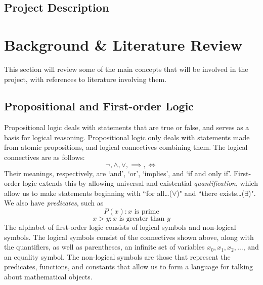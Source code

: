 \documentclass[12pt]{article}
\theoremstyle{definition}
\begin{document}
\subsection{Project Description}


\section{Background \& Literature Review}
This section will review some of the main concepts that will be involved in the project, with references to literature involving them.

\subsection{Propositional and First-order Logic}
Propositional logic deals with statements that are true or false, and serves as a basis for logical reasoning. Propositional logic only deals with statements made from atomic propositions, and logical connectives combining them. The logical connectives are as follows:
$$\neg, \wedge, \vee,\implies,\iff$$
Their meanings, respectively, are `and', `or', `implies', and `if and only if'.
\noindent
First-order logic extends this by allowing universal and existential \emph{quantification}, which allow us to make statements beginning with ``for all\ldots ($\forall$)" and ``there exists\ldots ($\exists$)". We also have \emph{predicates}, such as
$$P(x) : x \text{ is prime}$$
$$ x > y : x \text{ is greater than } y$$
\noindent
The alphabet of first-order logic consists of logical symbols and non-logical symbols.
The logical symbols consist of the connectives shown above, along with the quantifiers, as well as parentheses, an infinite set of variables $x_0, x_1, x_2,\ldots$, and an equality symbol.
The non-logical symbols are those that represent the predicates, functions, and constants that allow us to form a language for talking about mathematical objects.
\end{document}
